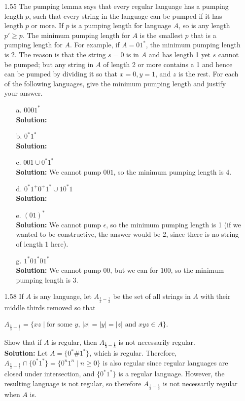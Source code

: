 \begin{enumerate}
\item[1.55]The pumping lemma says that every regular language has a pumping length $p$, such that every string in the language can be pumped if it has length $p$ or more. If $p$ is a pumping length for language $A$, so is any length $p' \ge p$. The minimum pumping length for $A$ is the smallest $p$ that is a pumping length for $A$. For example, if $A = 01^*$, the minimum pumping length is 2. The reason is that the string $s = 0$ is in $A$ and has length 1 yet $s$ cannot be pumped; but any string in $A$ of length 2 or more contains a 1 and hence can be pumped by dividing it so that $x = 0, y = 1$, and $z$ is the rest. For each of the following languages, give the minimum pumping length and justify your answer.
\begin{enumerate}
\item[a.]$0001^*$
\\ 
\textbf{Solution:} \alreadyanswered
\item[b.]$0^*1^*$
\\
\textbf{Solution:} \alreadyanswered
\item[c.]$001 \cup 0^*1^*$
\\
\textbf{Solution:} We cannot pump $001$, so the minimum pumping length is 4. 
\item[d.]$0^*1^+0^+1^* \cup 10^*1$
\\
\textbf{Solution:} \alreadyanswered
\item[e.]$(01)^*$
\\
\textbf{Solution:} We cannot pump $\epsilon$, so the minimum pumping length is 1 (if we wanted to be constructive, the answer would be 2, since there is no string of length 1 here). 
\item[g.]$1^*01^*01^*$
\\
\textbf{Solution:} We cannot pump $00$, but we can for $100$, so the minimum pumping length is 3. 
\end{enumerate}

\item[1.58]If $A$ is any language, let $A_{\frac{1}{3} - \frac{1}{3}}$ be the set of all strings in $A$ with their middle thirds removed so that
\begin{center}
$A_{\frac{1}{3} - \frac{1}{3}} = \{xz\;\vert\;\text{for some $y$, $|x| = |y| = |z|$ and $xyz \in A$}\}$.
\end{center}
Show that if $A$ is regular, then $A_{\frac{1}{3} - \frac{1}{3}}$ is not necessarily regular.
\\
\textbf{Solution:} Let $A = \{0^*\#1^*\}$, which is regular. Therefore, $A_{\frac{1}{3} - \frac{1}{3}} \cap \{0^*1^*\} = \{0^n1^n\;|\;n \ge 0\}$ is also regular since regular languages are closed under intersection, and $\{0^*1^*\}$ is a regular language. However, the resulting language is not regular, so therefore $A_{\frac{1}{3} - \frac{1}{3}}$ is not necessarily regular when $A$ is.


\end{enumerate}
